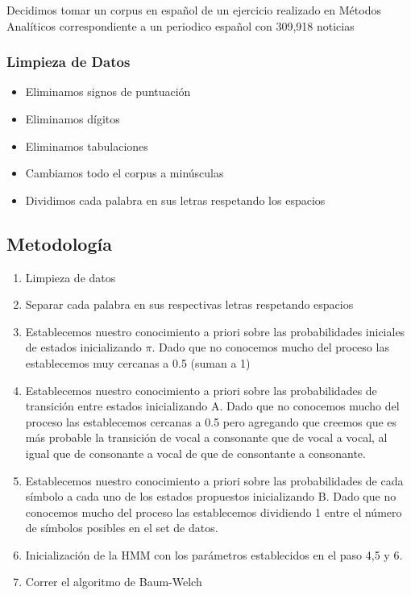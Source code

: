 \documentclass[]{article}
\begin{document}
Decidimos tomar un corpus en español de un ejercicio realizado en
Métodos Analíticos correspondiente a un periodico español con 309,918
noticias

\subsubsection{Limpieza de Datos}\label{limpieza-de-datos}

\begin{itemize}
\itemsep1pt\parskip0pt
\item
  Eliminamos signos de puntuación
\item
  Eliminamos dígitos
\item
  Eliminamos tabulaciones
\item
  Cambiamos todo el corpus a minúsculas
\item
  Dividimos cada palabra en sus letras respetando los espacios
\end{itemize}

\subsection{Metodología}\label{metodologia}

\begin{enumerate}
\def\labelenumi{\arabic{enumi}.}
\itemsep1pt\parskip0pt
\item
  Limpieza de datos
\item
  Separar cada palabra en sus respectivas letras respetando espacios
\item
  Establecemos nuestro conocimiento a priori sobre las probabilidades
  iniciales de estados inicializando $\pi$. Dado que no conocemos mucho
  del proceso las establecemos muy cercanas a 0.5 (suman a 1)
\item
  Establecemos nuestro conocimiento a priori sobre las probabilidades de
  transición entre estados inicializando A. Dado que no conocemos mucho
  del proceso las establecemos cercanas a 0.5 pero agregando que creemos
  que es más probable la transición de vocal a consonante que de vocal a
  vocal, al igual que de consonante a vocal de que de consontante a
  consonante.
\item
  Establecemos nuestro conocimiento a priori sobre las probabilidades de
  cada símbolo a cada uno de los estados propuestos inicializando B.
  Dado que no conocemos mucho del proceso las establecemos dividiendo 1
  entre el número de símbolos posibles en el set de datos.
\item
  Inicialización de la HMM con los parámetros establecidos en el paso
  4,5 y 6.
\item
  Correr el algoritmo de Baum-Welch
\end{enumerate}
\end{document}
